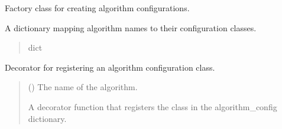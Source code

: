 \documentclass[letterpaper,10pt,english]{sphinxmanual}
\begin{document}
\begin{fulllineitems}
\label{\detokenize{modules:application.factories.AlgorithmFactory.AlgorithmFactory}}
\pysigstartsignatures
{}
\pysigstopsignatures
\sphinxAtStartPar
Factory class for creating algorithm configurations.

\begin{fulllineitems}
\label{\detokenize{modules:application.factories.AlgorithmFactory.AlgorithmFactory.algorithm_config}}
\pysigstartsignatures
{}
\pysigstopsignatures
\sphinxAtStartPar
A dictionary mapping algorithm names to their configuration classes.
\begin{quote}\begin{description}
\sphinxAtStartPar
dict

\end{description}\end{quote}

\end{fulllineitems}


\begin{fulllineitems}
\label{\detokenize{modules:application.factories.AlgorithmFactory.AlgorithmFactory.Configurator_for}}
\pysigstartsignatures
{}
\pysigstopsignatures
\sphinxAtStartPar
Decorator for registering an algorithm configuration class.
\begin{quote}\begin{description}
\sphinxAtStartPar
{} () \textendash{} The name of the algorithm.

\sphinxAtStartPar
A decorator function that registers the class in the algorithm\_config dictionary.


\end{description}
\end{quote}
\end{fulllineitems}
\end{fulllineitems}
\end{document}
